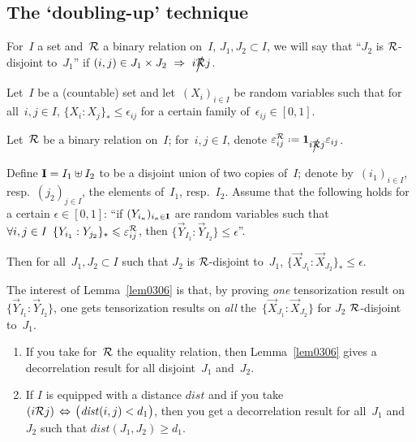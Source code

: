 \subsection{The `doubling-up' technique}\label{parTheDoublingUpTechnique}

\begin{Def}
For~$I$ a set and~$\mathcal{R}$ a binary relation on~$I$,
$J_1,J_2\subset I$, we will say that ``$J_2$ is $\mathcal{R}$-disjoint to~$J_1$''
if $(i,j)\in J_1\times J_2\ \Rightarrow\ i\notR j$.
\end{Def}

\begin{Lem}\label{lem0306}
Let~$I$ be a (countable) set and let~$(X_i)_{i\in I}$ be random variables
such that for all~$i,j\in I$, $\{X_i:X_j\}_* \leq \epsilon_{ij}$
for a certain family of~$\epsilon_{ij} \in [0,1]$.

Let~$\mathcal{R}$ be a binary relation on~$I$;
for~$i,j\in I$, denote $\epsilon^{\mcal{R}}_{ij} \coloneqq \1{i\notR j}\epsilon_{ij}$.

Define $\mathbf{I} = I_1 \uplus I_2$ to be a disjoint union of two copies of~$I$;
denote by~$(i_1)_{i\in I}$, resp.~$(j_2)_{j\in I}$, the elements of~$I_1$, resp.~$I_2$.
Assume that the following holds for a certain $\epsilon\in[0,1]$:
``if $(Y_{i_{\kappa}})_{i_{\kappa}\in\mathbf{I}}$ are random variables such that
$\forall i, j \in I\enskip\{Y_{i_1}:Y_{j_2}\}_{*}
\leq \epsilon^{\mcal{R}}_{ij}$, then $\{\vec{Y}_{I_1}:\vec{Y}_{I_2}\} \leq \epsilon$''.

Then for all~$J_1,J_2\subset I$ such that $J_2$ is $\mathcal{R}$-disjoint to~$J_1$,
$\{\vec{X}_{J_1}:\vec{X}_{J_2}\}_{*} \leq \epsilon$.
\end{Lem}

\begin{Rmk}
The interest of Lemma~\ref{lem0306} is that, by proving
\emph{one} tensorization result on ${\{\vec{Y}_{I_1}:\vec{Y}_{I_2}\}}$,
one gets tensorization results
on \emph{all} the~$\{\vec{X}_{J_1}:\vec{X}_{J_2}\}$
for $J_2$ $\mathcal{R}$-disjoint to~$J_1$.
\end{Rmk}

\begin{Xpl}\label{xpl1201}\strut
\begin{enumerate}
\item If you take for~$\mathcal{R}$ the equality relation,
then Lemma~\ref{lem0306} gives a decorrelation result
for all disjoint~$J_1$ and~$J_2$.
\item\label{itm1202} If $I$ is equipped with a distance $\mathit{dist}$
and if you take $(i\mcal{R}j) \, \Leftrightarrow \, {\big(\mathit{dist}(i,j)<d_1\big)}$,
then you get a decorrelation result for all~$J_1$ and~$J_2$
such that $\mathit{dist}(J_1,J_2) {\geq d_1}$.
\end{enumerate}
\end{Xpl}

